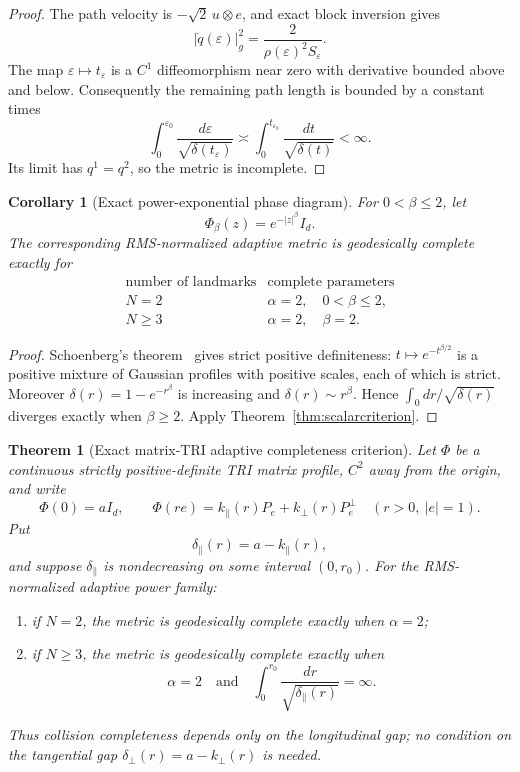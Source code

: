 \documentclass[11pt]{article}
\newtheorem{theorem}{Theorem}
\newtheorem{corollary}{Corollary}
\begin{document}
\begin{proof}
The path velocity is \(-\sqrt2\,u\otimes e\), and exact block inversion
gives
\[
 |\dot q(\varepsilon)|_g^2
 =\frac{2}{\rho(\varepsilon)^2S_\varepsilon}.
\]
The map \(\varepsilon\mapsto t_\varepsilon\) is a \(C^1\)
diffeomorphism near zero with derivative bounded above and below.
Consequently the remaining path length is bounded by a constant times
\[
 \int_0^{\varepsilon_0}
 \frac{d\varepsilon}{\sqrt{\delta(t_\varepsilon)}}
 \asymp
 \int_0^{t_{\varepsilon_0}}\frac{dt}{\sqrt{\delta(t)}}<\infty.
\]
Its limit has \(q^1=q^2\), so the metric is incomplete.
\end{proof}

\begin{corollary}[Exact power-exponential phase diagram]
\label{thm:stablephase}
For \(0<\beta\le2\), let
\[
 \Phi_\beta(z)=e^{-|z|^\beta}I_d.
\]
The corresponding RMS-normalized adaptive metric is geodesically complete
exactly for
\[
\begin{array}{c|c}
 \text{number of landmarks}&
 \text{complete parameters}\\ \hline
 N=2&\alpha=2,\quad 0<\beta\le2,\\
 N\ge3&\alpha=2,\quad \beta=2.
\end{array}
\]
\end{corollary}

\begin{proof}
Schoenberg's theorem~\cite{Schoenberg} gives strict positive definiteness:
\(t\mapsto e^{-t^{\beta/2}}\) is a positive mixture of Gaussian profiles
with positive scales, each of which is strict.  Moreover
\(\delta(r)=1-e^{-r^\beta}\) is increasing and
\(\delta(r)\sim r^\beta\).  Hence
\(\int_0dr/\sqrt{\delta(r)}\) diverges exactly when \(\beta\ge2\).
Apply Theorem~\ref{thm:scalarcriterion}.
\end{proof}

\begin{theorem}[Exact matrix-TRI adaptive completeness criterion]
\label{thm:matrixtricriterion}
Let \(\Phi\) be a continuous strictly positive-definite TRI matrix profile,
\(C^2\) away from the origin, and write
\[
 \Phi(0)=aI_d,\qquad
 \Phi(re)=k_\parallel(r)P_e+k_\perp(r)P_e^\perp
 \quad(r>0,\ |e|=1).
\]
Put
\[
 \delta_\parallel(r)=a-k_\parallel(r),
\]
and suppose \(\delta_\parallel\) is nondecreasing on some interval
\((0,r_0)\).  For the RMS-normalized adaptive power family:
\begin{enumerate}
\item if \(N=2\), the metric is geodesically complete exactly when
  \(\alpha=2\);
\item if \(N\ge3\), the metric is geodesically complete exactly when
  \begin{equation}
   \alpha=2
   \quad\text{and}\quad
   \int_0^{r_0}\frac{dr}{\sqrt{\delta_\parallel(r)}}=\infty.
   \label{eq:matrixtricriterion}
  \end{equation}
\end{enumerate}
Thus collision completeness depends only on the longitudinal gap; no
condition on the tangential gap
\(\delta_\perp(r)=a-k_\perp(r)\) is needed.
\end{theorem}
\end{document}
